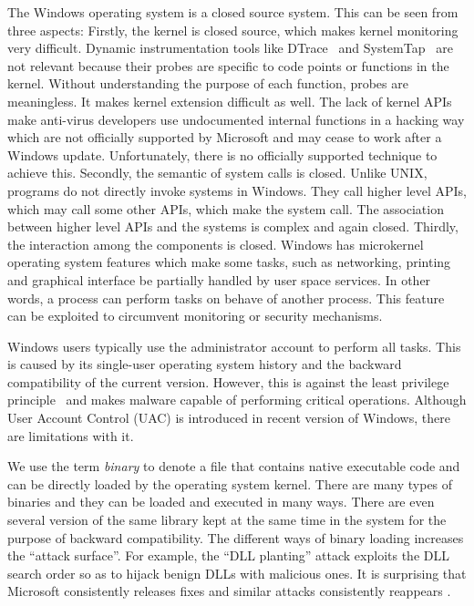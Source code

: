 The Windows operating system is a closed source system.
This can be seen from three aspects:
Firstly, the kernel is closed source, which makes kernel monitoring
very difficult.
Dynamic instrumentation tools like DTrace~\cite{cantrill2004dynamic} and
SystemTap~\cite{prasad2005systemtap} are not relevant because
their probes are specific to code points or functions in the kernel.
Without understanding the purpose of each function, probes are meaningless.
It makes kernel extension difficult as well.
The lack of kernel APIs make anti-virus developers use undocumented internal
functions in a hacking way which are
not officially supported by Microsoft and may cease to work
after a Windows update.
Unfortunately, there is no officially supported technique to achieve this.
Secondly, the semantic of system calls is closed.
Unlike UNIX, programs do not directly invoke systems in Windows.
They call higher level APIs, which may call some other APIs, which make
the system call.
The association between higher level APIs and the systems is complex and
again closed.
Thirdly, the interaction among the components is closed.
Windows has microkernel operating system features which make
some tasks, such as networking, printing and graphical interface be partially
handled by user space services.
In other words, a process can perform tasks on behave of another process.
This feature can be exploited to circumvent monitoring or
security mechanisms.

Windows users typically use the administrator account to perform all tasks.
This is caused by its single-user operating system history and the backward
compatibility of the current version.
However, this is against the least privilege
principle~\cite{saltzer1975protection} and makes malware capable of performing
critical operations.
Although User Account Control (UAC) is introduced in recent version of
Windows, there are limitations with it.

We use the term {\em binary} to denote a file that contains
native executable code and can be directly loaded by the operating system kernel.
There are many types of binaries and they can be loaded
and executed in many ways.
There are even several version of the same library kept at the same time
in the system for the purpose of backward compatibility.
The different ways of binary loading increases the ``attack surface''.
For example, the ``DLL planting'' attack exploits the DLL search order
so as to hijack benign DLLs with malicious ones.
It is surprising that Microsoft consistently releases fixes and similar attacks
consistently reappears \cite{binary-planting}.

